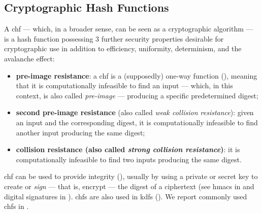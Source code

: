 \subsection{Cryptographic Hash Functions}\label{sec:hash_functions:cryptographic_hash_function}

A \gls{chf} --- which, in a broader sense, can be seen as a cryptographic algorithm --- is a hash function possessing 3 further security properties desirable for cryptographic use in addition to efficiency, uniformity, determinism, and the avalanche effect:

\begin{itemize}
	\item \textbf{pre-image resistance}: a \gls{chf} is a (supposedly) one-way function (), meaning that it is computationally infeasible to find an input --- which, in this context, is also called \textit{pre-image} --- producing a specific predetermined digest;
	\item \textbf{second pre-image resistance} (also called \textit{weak collision resistance}): given an input and the corresponding digest, it is computationally infeasible to find another input producing the same digest;
	\item \textbf{collision resistance (also called \textit{strong collision resistance})}: it is computationally infeasible to find two inputs producing the same digest.
\end{itemize}

\gls{chf} can be used to provide integrity (), usually by using a private or secret key to create or \textit{sign} --- that is, encrypt --- the digest of a ciphertext (see \glspl{hmac} in  and digital signatures in ). \glspl{chf} are also used in \glspl{kdf} (). We report commonly used \glspl{chf} in .


